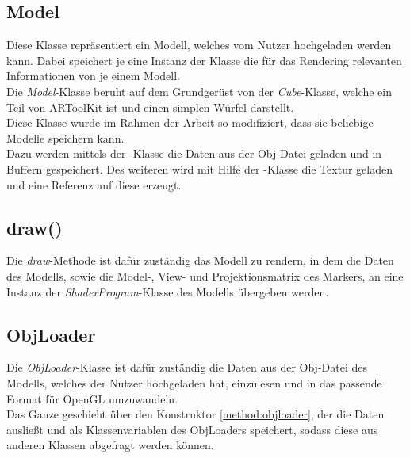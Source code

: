 \subsection{Model}\label{class:model}
Diese Klasse repräsentiert ein Modell, welches vom Nutzer hochgeladen werden kann. Dabei speichert je eine Instanz der Klasse die für das Rendering relevanten Informationen von je einem Modell. \\
Die \textit{Model}-Klasse beruht auf dem Grundgerüst von der \textit{Cube}-Klasse, welche ein Teil von ARToolKit ist und einen simplen Würfel darstellt.\\
Diese Klasse wurde im Rahmen der Arbeit so modifiziert, dass sie beliebige Modelle speichern kann.\\
Dazu werden mittels der \textit{}-Klasse die Daten aus der Obj-Datei geladen und in Buffern gespeichert. Des weiteren wird mit Hilfe der -Klasse die Textur geladen und eine Referenz auf diese erzeugt.\\

\subsection{draw()}
Die \textit{draw}-Methode ist dafür zuständig das Modell zu rendern, in dem die Daten des Modells, sowie die Model-, View- und Projektionsmatrix des Markers, an eine Instanz der \textit{ShaderProgram}-Klasse des Modells übergeben werden.


\subsection{ObjLoader}\label{class:objloader}
Die \textit{ObjLoader}-Klasse ist dafür zuständig die Daten aus der Obj-Datei des Modells, welches der Nutzer hochgeladen hat, einzulesen und in das passende Format für OpenGL umzuwandeln.\\ 
Das Ganze geschieht über den Konstruktor \ref{method:objloader}, der die Daten ausließt und als Klassenvariablen des ObjLoaders speichert, sodass diese aus anderen Klassen abgefragt werden können.

